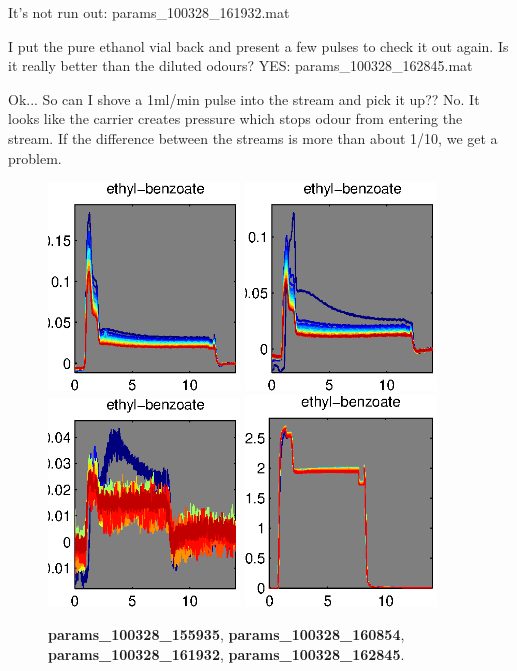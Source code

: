 \documentclass[a4paper]{report}
\begin{document}
It's not run out: params\_100328\_161932.mat


I put the pure ethanol vial back and present a few pulses to check it
out again. Is it really better than the diluted odours?
YES: params\_100328\_162845.mat

Ok... So can I shove a 1ml/min pulse into the stream and pick it up??
No. It looks like the carrier creates pressure which stops odour from
entering the stream. If the difference between the streams is more
than about 1/10, we get a problem. 


\begin{figure}[h]
\centering
\includegraphics[width=2in]{params_100328_155935.eps}
\includegraphics[width=2in]{params_100328_160854.eps}
\includegraphics[width=2in]{params_100328_161932.eps}
\includegraphics[width=2in]{params_100328_162845.eps}
\caption{\textbf{params\_100328\_155935},
  \textbf{params\_100328\_160854}, \textbf{params\_100328\_161932},
\textbf{params\_100328\_162845}.}
\end{figure}
\end{document}
